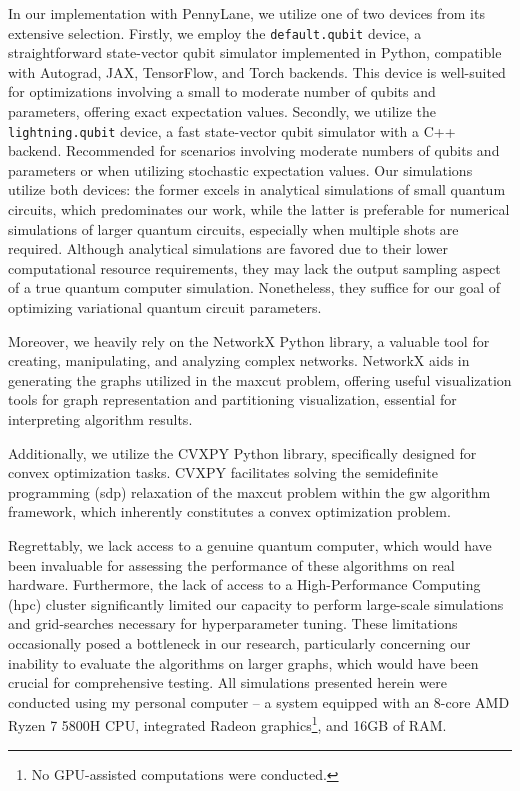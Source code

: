 In our implementation with PennyLane, we utilize one of two devices from its extensive selection. Firstly, we employ the \texttt{default.qubit} device, a straightforward state-vector qubit simulator implemented in Python, compatible with Autograd, JAX, TensorFlow, and Torch backends. This device is well-suited for optimizations involving a small to moderate number of qubits and parameters, offering exact expectation values. Secondly, we utilize the \texttt{lightning.qubit} device, a fast state-vector qubit simulator with a C++ backend. Recommended for scenarios involving moderate numbers of qubits and parameters or when utilizing stochastic expectation values. Our simulations utilize both devices: the former excels in analytical simulations of small quantum circuits, which predominates our work, while the latter is preferable for numerical simulations of larger quantum circuits, especially when multiple shots are required. Although analytical simulations are favored due to their lower computational resource requirements, they may lack the output sampling aspect of a true quantum computer simulation. Nonetheless, they suffice for our goal of optimizing variational quantum circuit parameters.

Moreover, we heavily rely on the NetworkX \cite{NetworkX} Python library, a valuable tool for creating, manipulating, and analyzing complex networks. NetworkX aids in generating the graphs utilized in the \acrshort{maxcut} problem, offering useful visualization tools for graph representation and partitioning visualization, essential for interpreting algorithm results.

Additionally, we utilize the CVXPY \cite{cvxpy} Python library, specifically designed for convex optimization tasks. CVXPY facilitates solving the semidefinite programming (\acrshort{sdp}) relaxation of the \acrshort{maxcut} problem within the \acrshort{gw} algorithm framework, which inherently constitutes a convex optimization problem.

Regrettably, we lack access to a genuine quantum computer, which would have been invaluable for assessing the performance of these algorithms on real hardware. Furthermore, the lack of access to a High-Performance Computing (\acrshort{hpc}) cluster significantly limited our capacity to perform large-scale simulations and grid-searches necessary for hyperparameter tuning. These limitations occasionally posed a bottleneck in our research, particularly concerning our inability to evaluate the algorithms on larger graphs, which would have been crucial for comprehensive testing. All simulations presented herein were conducted using my personal computer – a system equipped with an 8-core AMD Ryzen 7 5800H CPU, integrated Radeon graphics\footnote{No GPU-assisted computations were conducted.}, and 16GB of RAM.

